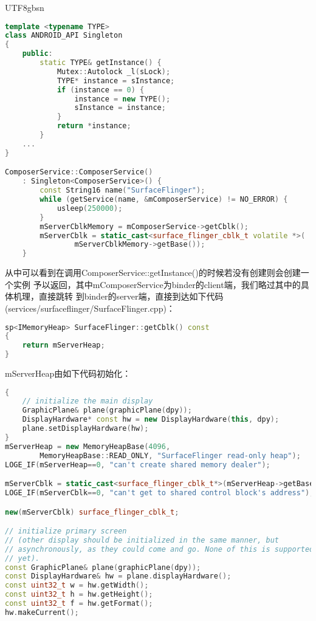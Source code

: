 \documentclass[a4paper,11pt]{article}
\begin{document}
\begin{CJK*}{UTF8}{gbsn}
\begin{enumerate}
\begin{lstlisting}[language=C++]
template <typename TYPE>
class ANDROID_API Singleton
{
    public:
        static TYPE& getInstance() {
            Mutex::Autolock _l(sLock);
            TYPE* instance = sInstance;
            if (instance == 0) {
                instance = new TYPE();
                sInstance = instance;
            }   
            return *instance;
        } 
    ...
}

ComposerService::ComposerService()
    : Singleton<ComposerService>() {
        const String16 name("SurfaceFlinger");
        while (getService(name, &mComposerService) != NO_ERROR) {
            usleep(250000);
        }
        mServerCblkMemory = mComposerService->getCblk();
        mServerCblk = static_cast<surface_flinger_cblk_t volatile *>(                                                                                                                             
                mServerCblkMemory->getBase());
    }
\end{lstlisting}
        从中可以看到在调用ComposerService::getInstance()的时候若没有创建则会创建一个实例
        予以返回，其中mComposerService为binder的client端，我们略过其中的具体机理，直接跳转
        到binder的server端，直接到达如下代码(services/surfaceflinger/SurfaceFlinger.cpp)：
\begin{lstlisting}[language=C++]
sp<IMemoryHeap> SurfaceFlinger::getCblk() const
{
    return mServerHeap;
}
\end{lstlisting}
        mServerHeap由如下代码初始化：
\begin{lstlisting}[language=C++]
{
    // initialize the main display
    GraphicPlane& plane(graphicPlane(dpy));
    DisplayHardware* const hw = new DisplayHardware(this, dpy);
    plane.setDisplayHardware(hw);                                                                                                                                                         
} 
mServerHeap = new MemoryHeapBase(4096,
        MemoryHeapBase::READ_ONLY, "SurfaceFlinger read-only heap");
LOGE_IF(mServerHeap==0, "can't create shared memory dealer");

mServerCblk = static_cast<surface_flinger_cblk_t*>(mServerHeap->getBase());
LOGE_IF(mServerCblk==0, "can't get to shared control block's address");

new(mServerCblk) surface_flinger_cblk_t;

// initialize primary screen
// (other display should be initialized in the same manner, but
// asynchronously, as they could come and go. None of this is supported
// yet).
const GraphicPlane& plane(graphicPlane(dpy));
const DisplayHardware& hw = plane.displayHardware();
const uint32_t w = hw.getWidth();
const uint32_t h = hw.getHeight();
const uint32_t f = hw.getFormat();
hw.makeCurrent();


\end{lstlisting}
\end{enumerate}
\end{CJK*}
\end{document}
